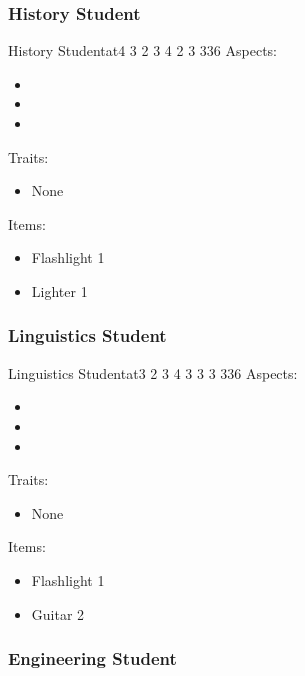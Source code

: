 \documentclass[11pt]{article}
\begin{document}
{\subsubsection{History Student}
\label{sec:org2746ae0}

\begin{npc}{History Student}{at}{4 3 2 3 4 2 3 3}{36}
Aspects:
\begin{itemize}
\item {}
\item {}
\item {}
\end{itemize}
\columnbreak

Traits:
\begin{itemize}
\item None
\end{itemize}

Items:
\begin{itemize}
\item Flashlight 1
\item Lighter 1
\end{itemize}
\end{npc}
\subsubsection{Linguistics Student}
\label{sec:org832a32d}

\begin{npc}{Linguistics Student}{at}{3 2 3 4 3 3 3 3}{36}
Aspects:
\begin{itemize}
\item {}
\item {}
\item {}
\end{itemize}
\columnbreak

Traits:
\begin{itemize}
\item None
\end{itemize}

Items:
\begin{itemize}
\item Flashlight 1
\item Guitar 2
\end{itemize}
\end{npc}
\subsubsection{Engineering Student}
\label{sec:org45bd211}

}
\end{document}

